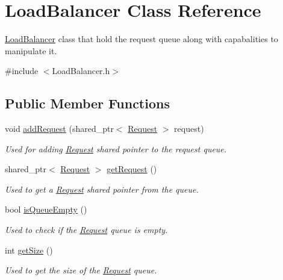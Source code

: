 \hypertarget{classLoadBalancer}{}\section{Load\+Balancer Class Reference}
\label{classLoadBalancer}


\hyperlink{classLoadBalancer}{Load\+Balancer} class that hold the request queue along with capabalities to manipulate it.  




{\ttfamily \#include $<$Load\+Balancer.\+h$>$}

\subsection*{Public Member Functions}
\begin{DoxyCompactItemize}
\item 
void \hyperlink{classLoadBalancer_a2efdf7d7e22b78a284eb0031b109f0b0}{add\+Request} (shared\+\_\+ptr$<$ \hyperlink{classRequest}{Request} $>$ request)
\begin{DoxyCompactList}\small\item\em Used for adding \hyperlink{classRequest}{Request} shared pointer to the request queue. \end{DoxyCompactList}\item 
shared\+\_\+ptr$<$ \hyperlink{classRequest}{Request} $>$ \hyperlink{classLoadBalancer_aa79b2225c613810e695c2b07b38e93c2}{get\+Request} ()
\begin{DoxyCompactList}\small\item\em Used to get a \hyperlink{classRequest}{Request} shared pointer from the queue. \end{DoxyCompactList}\item 
bool \hyperlink{classLoadBalancer_a27b39e3bd5ac47e6845ec63c73cbe436}{is\+Queue\+Empty} ()
\begin{DoxyCompactList}\small\item\em Used to check if the \hyperlink{classRequest}{Request} queue is empty. \end{DoxyCompactList}\item 
int \hyperlink{classLoadBalancer_ae410e0a4d5fe01f6aaebd34c7edb4a54}{get\+Size} ()
\begin{DoxyCompactList}\small\item\em Used to get the size of the \hyperlink{classRequest}{Request} queue. \end{DoxyCompactList}\end{DoxyCompactItemize}
